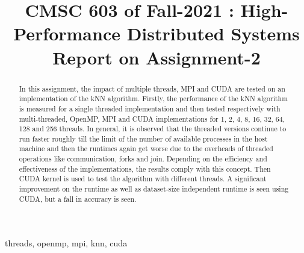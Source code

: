 \documentclass[conference]{IEEEtran}
\begin{document}
\title{CMSC 603 of Fall-2021 : High-Performance Distributed Systems\\Report on Assignment-2
}

\author{
}

\maketitle

\begin{abstract}
In this assignment, the impact of multiple threads, MPI and CUDA are tested on an implementation of the kNN algorithm. Firstly, the performance of the kNN algorithm is measured for a single threaded implementation and then tested respectively with multi-threaded, OpenMP, MPI and CUDA implementations for 1, 2, 4, 8, 16, 32, 64, 128 and 256 threads. In general, it is observed that the threaded versions continue to run faster roughly till the limit of the number of available processes in the host machine and then the runtimes again get worse due to the overheads of threaded operations like communication, forks and join. Depending on the efficiency and effectiveness of the implementations, the results comply with this concept.
Then CUDA kernel is used to test the algorithm with different threads. A significant improvement on the runtime as well as dataset-size independent runtime is seen using CUDA, but a fall in accuracy is seen.
\end{abstract}

\begin{IEEEkeywords}
threads, openmp, mpi, knn, cuda
\end{IEEEkeywords}
\end{document}
